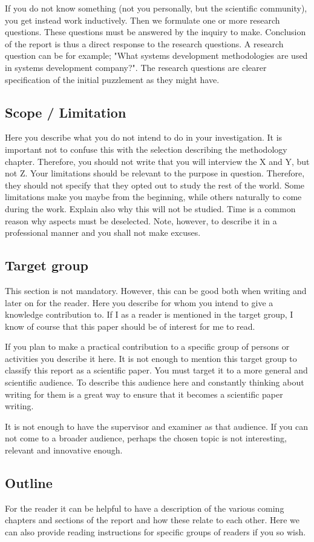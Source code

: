 If you do not know something (not you personally, but the scientific community), you get instead work inductively. Then we formulate one or more research questions. These questions must be answered by the inquiry to make. Conclusion of the report is thus a direct response to the research questions. A research question can be for example; "What systems development methodologies are used in systems development company?". The research questions are clearer specification of the initial puzzlement as they might have.

\subsection{Scope / Limitation}
Here you describe what you do not intend to do in your investigation. It is important not to confuse this with the selection describing the methodology chapter. Therefore, you should not write that you will interview the X and Y, but not Z. Your limitations should be relevant to the purpose in question. Therefore, they should not specify that they opted out to study the rest of the world. Some limitations make you maybe from the beginning, while others naturally to come during the work. Explain also why this will not be studied. Time is a common reason why aspects must be deselected. Note, however, to describe it in a professional manner and you shall not make excuses.

\subsection{Target group}
This section is not mandatory. However, this can be good both when writing and later on for the reader. Here you describe for whom you intend to give a knowledge contribution to. If I as a reader is mentioned in the target group, I know of course that this paper should be of interest for me to read.

If you plan to make a practical contribution to a specific group of persons or activities you describe it here. It is not enough to mention this target group to classify this report as a scientific paper. You must target it to a more general and scientific audience. To describe this audience here and constantly thinking about writing for them is a great way to ensure that it becomes a scientific paper writing.

It is not enough to have the supervisor and examiner as that audience. If you can not come to a broader audience, perhaps the  chosen topic is not interesting, relevant and innovative enough.

\subsection{Outline}
For the reader it can be helpful to have a description of the various coming chapters and sections of the report and how these relate to each other. Here we can also provide reading instructions for specific groups of readers if you so wish.